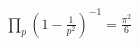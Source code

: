 \documentclass[preview]{standalone}
\begin{document}
\begin{align*}
\prod_{p} \left(1 - \frac{1}{p^2}\right)^{-1} = \frac{\pi^2}{6}
\end{align*}
\end{document}
